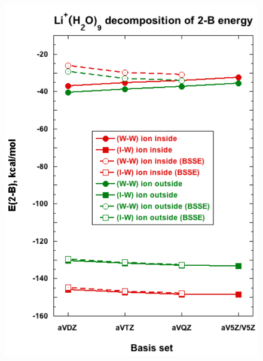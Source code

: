 \documentclass[11pt, proquest]{uwthesis}[2020/02/24]
\begin{document}
\begin{figure}[t]
\uwsinglespace
\begin{center}
\begin{minipage}{0.45\textwidth}
\includegraphics[width=\textwidth]{Figures/Chapter_3/figure_3_left.pdf}
\end{minipage}
\begin{minipage}{0.45\textwidth}

\end{minipage}
\end{center}
\end{figure}
\end{document}

